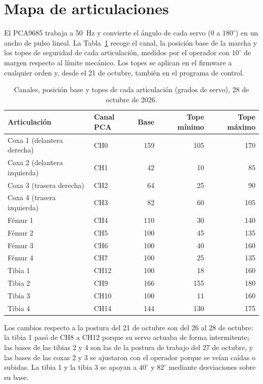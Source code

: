 \section{Mapa de articulaciones}

El PCA9685 trabaja a 50~Hz y convierte el ángulo de cada servo (0 a $180^\circ$)
en un ancho de pulso lineal. La Tabla~\ref{tab:mapa-articulaciones} recoge el
canal, la posición base de la marcha y los topes de seguridad de cada
articulación, medidos por el operador con $10^\circ$ de margen respecto al límite
mecánico. Los topes se aplican en el firmware a cualquier orden y, desde el 21
de octubre, también en el programa de control.

\begin{table}[H]
\centering
\caption{Canales, posición base y topes de cada articulación (grados de servo), 28 de octubre de 2026.}
\label{tab:mapa-articulaciones}
\small
\begin{tabular}{llrrr}
\toprule
Articulación & Canal PCA & Base & Tope mínimo & Tope máximo \\
\midrule
Coxa 1 (delantera derecha) & CH0 & 159 & 105 & 170 \\
Coxa 2 (delantera izquierda) & CH1 & 42 & 10 & 85 \\
Coxa 3 (trasera derecha) & CH2 & 64 & 25 & 90 \\
Coxa 4 (trasera izquierda) & CH3 & 82 & 60 & 105 \\
Fémur 1 & CH4 & 110 & 30 & 140 \\
Fémur 2 & CH5 & 100 & 45 & 135 \\
Fémur 3 & CH6 & 100 & 40 & 160 \\
Fémur 4 & CH7 & 100 & 25 & 135 \\
Tibia 1 & CH12 & 100 & 18 & 160 \\
Tibia 2 & CH9 & 166 & 155 & 180 \\
Tibia 3 & CH10 & 100 & 11 & 160 \\
Tibia 4 & CH14 & 144 & 130 & 175 \\
\bottomrule
\end{tabular}
\end{table}

Los cambios respecto a la postura del 21 de octubre son del 26 al 28 de octubre: la
tibia 1 pasó de CH8 a CH12 porque su servo actuaba de forma intermitente; las bases
de las tibias 2 y 4 son las de la postura de trabajo del 27 de octubre, y las bases de
las coxas 2 y 3 se ajustaron con el operador porque se veían caídas o subidas. La tibia
1 y la tibia 3 se apoyan a $40^\circ$ y $82^\circ$ mediante desviaciones sobre su base.

